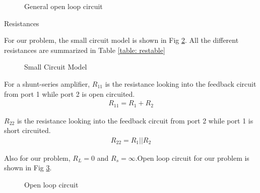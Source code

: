 \begin{enumerate}[label=\arabic*.,ref=\theenumi]
\begin{figure}[!ht]
	\begin{center}
		
		\resizebox{\columnwidth}{!}{}
	\end{center}
\caption{General open loop circuit}
\label{fig:ee18btech11038_genamp}
\end{figure}

\begin{table}[!ht]
\centering

\caption{Resistances}
\label{table: restable}
\end{table}

For our problem, the small circuit model is shown in Fig \ref{fig:ee18btech11038_smlckt}. All the different resistances are summarized in Table \ref{table: restable}

\begin{figure}[!ht]
	\begin{center}
		
		\resizebox{\columnwidth}{!}{}
	\end{center}
\caption{Small Circuit Model}
\label{fig:ee18btech11038_smlckt}
\end{figure}



For a shunt-series amplifier, $R_{11}$ is the resistance looking into the feedback circuit from port 1 while port 2 is open circuited.
\begin{align}
    R_{11} = R_{1} + R_{2}
\end{align}

$R_{22}$ is the resistance looking into the feedback circuit from port 2 while port 1 is short circuited.
\begin{align}
    R_{22} = R_{1}||R_{2}
\end{align}

Also for our problem, $R_{L} = 0$ and $R_{s} = \infty$.Open loop circuit for our problem is shown in Fig \ref{fig:ee18btech11038_Ackt}.
\begin{figure}[!ht]
	\begin{center}
		
		\resizebox{\columnwidth}{!}{}
	\end{center}
\caption{Open loop circuit}
\label{fig:ee18btech11038_Ackt}
\end{figure}


\end{enumerate}
